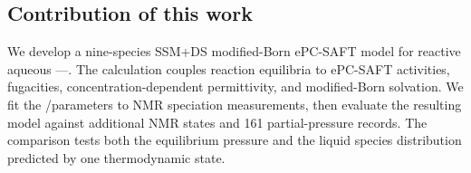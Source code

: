 

\subsection{Contribution of this work}
We develop a nine-species SSM+DS modified-Born ePC-SAFT model for reactive aqueous \MEA--\HtwoO--\COtwo.  The calculation couples reaction equilibria to ePC-SAFT activities, fugacities, concentration-dependent permittivity, and modified-Born solvation.  We fit the \MEAH/\MEACOO parameters to NMR speciation measurements, then evaluate the resulting model against additional NMR states and 161 \COtwo partial-pressure records.  The comparison tests both the equilibrium pressure and the liquid species distribution predicted by one thermodynamic state.
